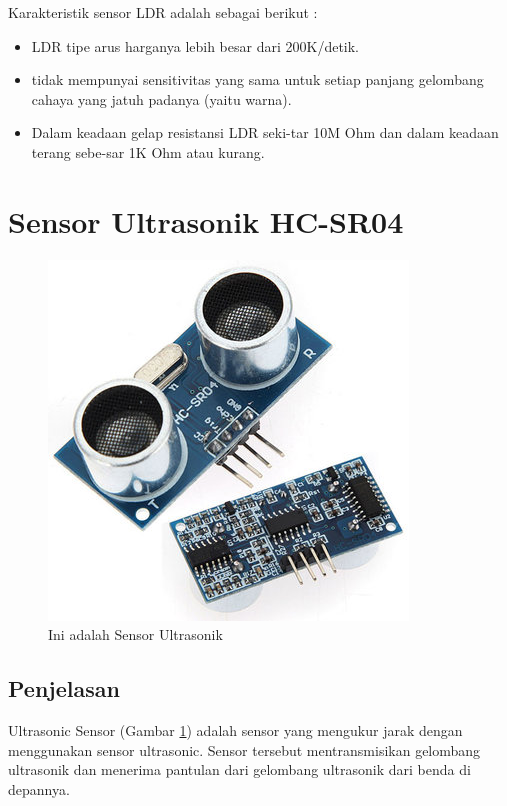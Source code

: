 Karakteristik sensor LDR adalah sebagai berikut :

\begin{itemize}
	\item LDR tipe arus harganya lebih besar dari 200K/detik.
	\item tidak mempunyai sensitivitas yang sama untuk setiap panjang gelombang cahaya yang jatuh padanya (yaitu warna).
	\item Dalam keadaan gelap resistansi LDR seki-tar 10M Ohm dan dalam keadaan terang sebe-sar 1K Ohm atau kurang.
\end{itemize}

\section{Sensor Ultrasonik HC-SR04}
\begin{figure}[!htbp]
  \centering
  \includegraphics[width=.75\textwidth]{figures/Arduino/sensor.jpg}
  \caption{Ini adalah Sensor Ultrasonik}\label{fig:ultra}
\end{figure}

\subsection{Penjelasan}
Ultrasonic Sensor (Gambar \ref{fig:ultra}) adalah sensor yang mengukur jarak dengan menggunakan sensor ultrasonic. Sensor tersebut mentransmisikan gelombang ultrasonik dan menerima pantulan dari gelombang ultrasonik dari benda di depannya. 

